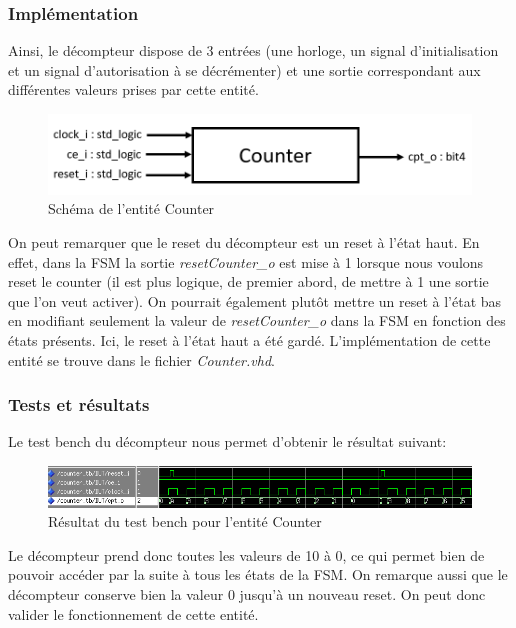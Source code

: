 \documentclass[a4paper, 12pt]{article}
\begin{document}
		\subsubsection{Implémentation}
Ainsi, le décompteur dispose de 3 entrées (une horloge, un signal d'initialisation et un signal d'autorisation à se décrémenter) et une sortie correspondant aux différentes valeurs prises par cette entité.
			\begin{figure}[H]
				\begin{center}
				\includegraphics[scale=0.5]{Images/CounterEntity.png}
				\end{center}
				\caption{Schéma de l'entité Counter}
				\label{CounterEntity}
			\end{figure}
On peut remarquer que le reset du décompteur est un reset à l'état haut. En effet, dans la FSM la sortie \emph{resetCounter\_o} est mise à 1 lorsque nous voulons reset le counter (il est plus logique, de premier abord, de mettre à 1 une sortie que l'on veut activer). On pourrait également plutôt mettre un reset à l'état bas en modifiant seulement la valeur de \emph{resetCounter\_o} dans la FSM en fonction des états présents. Ici, le reset à l'état haut a été gardé.
	L'implémentation de cette entité se trouve dans le fichier \emph{Counter.vhd}.

		\subsubsection{Tests et résultats}
	Le test bench du décompteur nous permet d'obtenir le résultat suivant:
			\begin{figure}[H]
				\begin{center}
				\includegraphics[scale=0.7]{Images/CounterTb.png}
				\end{center}
				\caption{Résultat du test bench pour l'entité Counter}
				\label{CounterTb}
			\end{figure}
Le décompteur prend donc toutes les valeurs de 10 à 0, ce qui permet bien de pouvoir accéder par la suite à tous les états de la FSM. On remarque aussi que le décompteur conserve bien la valeur 0 jusqu'à un nouveau reset. On peut donc valider le fonctionnement de cette entité.
\end{document}
